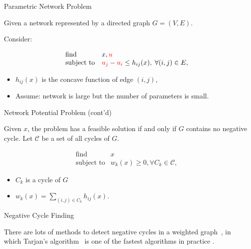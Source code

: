 \documentclass[
  ignorenonframetext,
  aspectratio=169,
  serif,onlymath]{beamer}
\begin{document}
\begin{frame}{Parametric Network Problem}
\protect\hypertarget{parametric-network-problem}{}

Given a network represented by a directed graph \(G = (V, E)\).

Consider:

\[\begin{array}{ll}
    \text{find} & x, {\color{red}u} \\
    \text{subject to} & {\color{red}u_j} - {\color{red}u_i} \le h_{ij}(x), \; \forall (i, j) \in E ,
   \end{array}\]

\begin{itemize}
\item
  \(h_{ij}(x)\) is the concave function of edge \((i,j)\),
\item
  Assume: network is large but the number of parameters is small.
\end{itemize}

\end{frame}

\begin{frame}{Network Potential Problem (cont'd)}
\protect\hypertarget{network-potential-problem-contd}{}

Given \(x\), the problem has a feasible solution if and only if \(G\)
contains no negative cycle. Let \(\mathcal{C}\) be a set of all cycles
of \(G\).

\[\begin{array}{ll}
    \text{find} & x \\
    \text{subject to} & w_k(x) \ge 0, \forall C_k \in \mathcal{C} ,
\end{array}\]

\begin{itemize}
\item
  \(C_k\) is a cycle of \(G\)
\item
  \(w_k(x) = \sum_{ (i,j)\in C_k} h_{ij}(x)\).
\end{itemize}

\end{frame}

\begin{frame}{Negative Cycle Finding}
\protect\hypertarget{negative-cycle-finding}{}

There are lots of methods to detect negative cycles in a weighted
graph~\citep{cherkassky1999negative}, in which Tarjan's
algorithm~\citep{Tarjan1981negcycle} is one of the fastest algorithms in
practice \citep{alg:dasdan_mcr, cherkassky1999negative}.

\end{frame}
\end{document}
